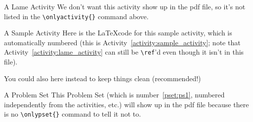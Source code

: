 \documentclass[12pt]{article}
\author{} %
\date{} %
\begin{document}
\begin{activity}{A Lame Activity}
	We don't want this activity show up in the pdf file, so it's not listed in the \verb|\onlyactivity{}| command above.
\end{activity}

\begin{activity}{A Sample Activity}
	Here is the \LaTeX code for this sample activity, which is automatically numbered (this is Activity~\ref{activity:sample_activity}; note that Activity~\ref{activity:lame_activity} can still be \verb|\ref|'d even though it isn't in this file).
	
	You could also \verb|| here instead to keep things clean (recommended!)
\end{activity}

\begin{pset}[ps1]{A Problem Set}
	This Problem Set (which is number~\ref{pset:ps1}, numbered independently from the activities, etc.) will show up in the pdf file because there is no \verb|\onlypset{}| command to tell it not to.
\end{pset}
\end{document}
